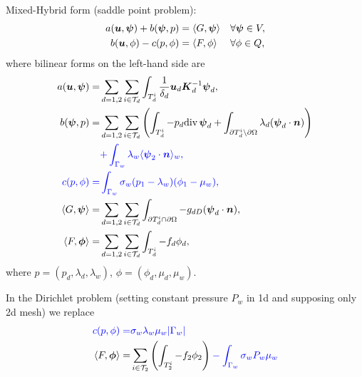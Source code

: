   
  Mixed-Hybrid form (saddle point problem): 
\begin{align}
        \label{Saddle1}
 a(\mathbf{\boldsymbol{u}},\mathbf{\boldsymbol{\psi}}) + b(\mathbf{\boldsymbol{\psi}}, p) &= \langle G, \mathbf{\boldsymbol{\psi}}\rangle &&\forall 
\mathbf{\boldsymbol{\psi}}\in V,\\
        \label{Saddle2}
 b(\mathbf{\boldsymbol{u}}, \phi) - c(p,\phi) &= \langle F, \phi \rangle &&\forall \phi \in Q,
\end{align}
where bilinear forms on the left-hand side are
\begin{align*}
 a(\vc u, \vc \psi)=&\sum_{d=1,2}\sum_{i\in \mathcal T_d} \int_{T_d^i}
   \frac{1}{\delta_d} \vc u_d \vc K_d^{-1} \vc \psi_d,\\
%
 b(\vc \psi, p)=&\sum_{d=1,2}\sum_{i\in \mathcal T_d} 
        \left(
        \int_{T_d^i} -p_d\div\,\vc \psi_d
        +\int_{\prtl T_d^i\setminus \prtl\Omega}
                 \lambda_d (\vc \psi_d \cdot \vc n)
        \right) \\
        &\color{blue}{
            + \int_{\Gamma_w} \lambda_w \avg{\vc \psi_2 \cdot \vc n}_w},\\
%
\color{blue}
 c(p,\phi) =& \color{blue}
          \int_{\Gamma_w}
               \sigma_w(p_{1}-\lambda_w)(\phi_{1}-\mu_w),\\
 \langle G, \vc \psi\rangle =& \sum_{d=1,2}\sum_{i\in \mathcal T_d}
        \int_{\prtl T_d^i\cap \prtl\Omega}
                 - g_{dD} (\vc \psi_d \cdot \vc n),\\
 \langle F, \vc \phi\rangle =& \sum_{d=1,2}\sum_{i\in \mathcal T_d}
        \int_{T_d^i} - f_d \phi_d,
\end{align*}
where $p=(p_d,\lambda_d, \lambda_w)$, $\phi=(\phi_d,\mu_d, \mu_w)$.

In the Dirichlet problem (setting constant pressure $P_w$ in 1d and supposing only 2d mesh) we replace
\begin{align*}
\color{blue}
c(p,\phi) =& \color{blue} \sigma_w\lambda_w\mu_w| \Gamma_w | \\
\langle F, \mathbf{\boldsymbol{\phi}}\rangle =& \sum_{i\in \mathcal T_2}
        \left(\int_{T_2^i} - f_2 \phi_2\right) \color{blue} -{\int_{\Gamma_w}\sigma_w P_w \mu_w}
\end{align*}


